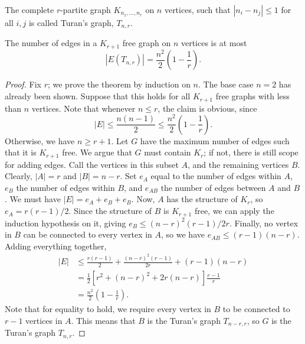\documentclass[11pt]{article}
\theoremstyle{definition}
\theoremstyle{remark}
\numberwithin{equation}{section}
\begin{document}
    \begin{definition}
        The complete $r$-partite graph $K_{n_1, \dots, n_r}$ on $n$ vertices, such
        that $|n_i - n_j| \leq 1$ for all $i, j$ is called Turan's graph, $T_{n, r}$.
    \end{definition}

    \begin{theorem}
        The number of edges in a $K_{r + 1}$ free graph on $n$ vertices is at most \[
            |E(T_{n, r})| = \frac{n^2}{2} \left(1 - \frac{1}{r}\right).
        \]
    \end{theorem}
    \begin{proof}
        Fix $r$; we prove the theorem by induction on $n$. The base case $n = 2$ has
        already been shown. Suppose that this holds for all $K_{r + 1}$ free graphs
        with less than $n$ vertices. Note that whenever $n \leq r$, the claim is
        obvious, since \[
            |E| \leq \frac{n (n - 1)}{2} \leq \frac{n^2}{2}\left(1 -
            \frac{1}{r}\right).
        \] Otherwise, we have $n \geq r + 1$. Let $G$ have the maximum number of
        edges such that it is $K_{r + 1}$ free. We argue that $G$ must contain $K_r$;
        if not, there is still scope for adding edges. Call the vertices in this
        subset $A$, and the remaining vertices $B$. Clearly, $|A| = r$ and $|B| = n -
        r$. Set $e_A$ equal to the number of edges within $A$, $e_B$ the number of
        edges within $B$, and $e_{AB}$ the number of edges between $A$ and $B$. We
        must have $|E| = e_A + e_B + e_B$. Now, $A$ has the structure of $K_r$, so
        $e_A = r(r - 1) / 2$. Since the structure of $B$ is $K_{r + 1}$ free, we can
        apply the induction hypothesis on it, giving $e_{B} \leq (n - r)^2(r - 1) /
        2r$. Finally, no vertex in $B$ can be connected to every vertex in $A$, so we
        have $e_{AB} \leq (r - 1)(n - r)$. Adding everything together, 
        \begin{align*}
            |E| &\leq \frac{r (r - 1)}{2} + \frac{(n - r)^2(r - 1)}{2r} + (r - 1)(n -
            r) \\
            &= \frac{1}{2} \left[r^2 + (n - r)^2 + 2r(n - r)\right]\frac{r - 1}{r} \\
            &= \frac{n^2}{2}\left(1 - \frac{1}{r}\right).
        \end{align*}
        Note that for equality to hold, we require every vertex in $B$ to be
        connected to $r - 1$ vertices in $A$. This means that $B$ is the Turan's
        graph $T_{n - r, r}$, so $G$ is the Turan's graph $T_{n, r}$.
    \end{proof}
\end{document}
